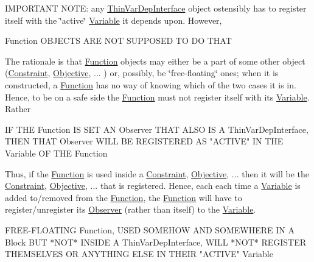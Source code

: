 I\+M\+P\+O\+R\+T\+A\+NT N\+O\+TE\+: any \mbox{\hyperlink{class_s_m_spp__di__unipi__it_1_1_thin_var_dep_interface}{Thin\+Var\+Dep\+Interface}} object ostensibly has to register itself with the \char`\"{}active\char`\"{} \mbox{\hyperlink{class_s_m_spp__di__unipi__it_1_1_variable}{Variable}} it depends upon. However, \begin{DoxyVerb}    Function OBJECTS ARE NOT SUPPOSED TO DO THAT
\end{DoxyVerb}


The rationale is that \mbox{\hyperlink{class_s_m_spp__di__unipi__it_1_1_function}{Function}} objects may either be a part of some other object (\mbox{\hyperlink{class_s_m_spp__di__unipi__it_1_1_constraint}{Constraint}}, \mbox{\hyperlink{class_s_m_spp__di__unipi__it_1_1_objective}{Objective}}, ... ) or, possibly, be \char`\"{}free-\/floating\char`\"{} ones; when it is constructed, a \mbox{\hyperlink{class_s_m_spp__di__unipi__it_1_1_function}{Function}} has no way of knowing which of the two cases it is in. Hence, to be on a safe side the \mbox{\hyperlink{class_s_m_spp__di__unipi__it_1_1_function}{Function}} must not register itself with its \mbox{\hyperlink{class_s_m_spp__di__unipi__it_1_1_variable}{Variable}}. Rather \begin{DoxyVerb}    IF THE Function IS SET AN Observer THAT ALSO IS A
    ThinVarDepInterface, THEN THAT Observer WILL BE REGISTERED
    AS "ACTIVE" IN THE Variable OF THE Function
\end{DoxyVerb}


Thus, if the \mbox{\hyperlink{class_s_m_spp__di__unipi__it_1_1_function}{Function}} is used inside a \mbox{\hyperlink{class_s_m_spp__di__unipi__it_1_1_constraint}{Constraint}}, \mbox{\hyperlink{class_s_m_spp__di__unipi__it_1_1_objective}{Objective}}, ... then it will be the \mbox{\hyperlink{class_s_m_spp__di__unipi__it_1_1_constraint}{Constraint}}, \mbox{\hyperlink{class_s_m_spp__di__unipi__it_1_1_objective}{Objective}}, ... that is registered. Hence, each each time a \mbox{\hyperlink{class_s_m_spp__di__unipi__it_1_1_variable}{Variable}} is added to/removed from the \mbox{\hyperlink{class_s_m_spp__di__unipi__it_1_1_function}{Function}}, the \mbox{\hyperlink{class_s_m_spp__di__unipi__it_1_1_function}{Function}} will have to register/unregister its \mbox{\hyperlink{class_s_m_spp__di__unipi__it_1_1_observer}{Observer}} (rather than itself) to the \mbox{\hyperlink{class_s_m_spp__di__unipi__it_1_1_variable}{Variable}}. \begin{DoxyVerb}    FREE-FLOATING Function, USED SOMEHOW AND SOMEWHERE IN A Block
    BUT *NOT* INSIDE A ThinVarDepInterface, WILL *NOT* REGISTER
    THEMSELVES OR ANYTHING ELSE IN THEIR "ACTIVE" Variable
\end{DoxyVerb}


